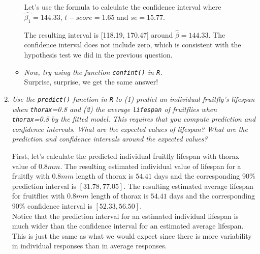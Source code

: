 \documentclass[12pt,letterpaper]{article}
\begin{document}
\begin{enumerate}[label=(\alph*)]
\begin{itemize}
			
			Let's use the formula to calculate the confidence interval where $\hat{\beta_{1}} = 144.33$, $t-score = 1.65$ and $se = 15.77$. \\
						\vspace{.15cm}
			  
			\vspace{.25cm}
			
			The resulting interval is [118.19, 170.47] around $\hat{\beta}=144.33$.  The confidence interval does not include zero, which is consistent with the hypothesis test we did in the previous question. 
			\vspace{.15cm}
		\item
		\emph{Now, try using the function  \texttt{confint()}  in \texttt{R}.}\\
		
		Surprise, surprise, we get the same answer!
					\vspace{.15cm}
					  
					
	\end{itemize}
			\vspace{6cm}
	\item \emph{Use the \texttt{predict()} function in \texttt{R} to (1) predict an individual fruitfly's lifespan when \texttt{thorax}=0.8 and (2) the average \texttt{lifespan} of fruitflies when \texttt{thorax}=0.8 by the fitted model. This requires that you compute prediction and confidence intervals. What are the expected values of lifespan? What are the prediction and confidence intervals around the expected values? }
	
		\vspace{.15cm}
	  
			\vspace{.15cm}
First, let's calculate the predicted individual fruitfly lifespan with thorax value of $0.8 mm$. The resulting estimated individual value of lifespan for a fruitfly with $0.8 mm$ length of thorax is $54.41$ days and the corresponding 90\% prediction interval is $[31.78, 77.05]$. The resulting estimated average lifespan for fruitflies with $0.8 mm$ length of thorax is $54.41$ days and the corresponding 90\% confidence interval is $[52.33, 56.50]$. \\

Notice that the prediction interval for an estimated individual lifespan is much wider than the confidence interval for an estimated average lifespan. This is just the same as what we would expect since there is more variability in individual responses than in average responses. 
		\vspace{.25cm}


\end{enumerate}
\end{document}
